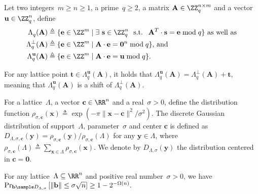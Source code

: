 \begin{definition} \label{de:qary-lattices} 
  Let two integers~$m \geq n \geq 1$, a prime~$q \geq 2$, a matrix $\mathbf{A} \in \ZZ_q^{n \times m}$ and a vector~$\mathbf{u} \in \ZZ_q^n$, define
  \begin{align*}
    \Lambda_q^{}(\mathbf{A})               & \triangleq \{ \mathbf{e} \in \ZZ^m_{} \mid \exists~\mathbf{s} \in \ZZ_q^n ~\text{ s.t. }~\mathbf{A}^T_{} \cdot \mathbf{s} = \mathbf{e} \bmod q \} \text{ as well as}\\
    \Lambda_q^{\perp} (\mathbf{A})      & \triangleq \{\mathbf{e} \in \ZZ^m_{} \mid \mathbf{A} \cdot \mathbf{e} = \mathbf{0}^n \bmod q \} \text{, and}\\
    \Lambda_q^{\mathbf{u}} (\mathbf{A}) & \triangleq  \{\mathbf{e} \in \ZZ^m_{} \mid \mathbf{A} \cdot \mathbf{e} = \mathbf{u} \bmod q \}.
  \end{align*}

  For any lattice point $\mathbf{t} \in \Lambda_q^{\mathbf{u}} (\mathbf{A})$, it holds that $\Lambda_q^{\mathbf{u}}(\mathbf{A})=\Lambda_q^{\perp}(\mathbf{A}) + \mathbf{t}$, meaning that $\Lambda_q^{\mathbf{u}} (\mathbf{A}) $
  is a shift of   $\Lambda_q^{\perp} (\mathbf{A})$.
\end{definition}

\begin{definition} 
  For a lattice~$\Lambda$, a vector $\mathbf{c} \in \RR^n$ and a real~$\sigma>0$, define the distribution function
  $\rho_{\sigma,\mathbf{c}}(\mathbf{x}) \triangleq \exp(-\pi\|\mathbf{x}- \mathbf{c} \|^2/\sigma^2)$.
  The discrete Gaussian distribution of support~$\Lambda$, parameter~$\sigma$ and center $\mathbf{c}$ is defined as
  $D_{\Lambda,\sigma,\mathbf{c}}(\mathbf{y}) = \rho_{\sigma,\mathbf{c}}(\mathbf{y})/\rho_{\sigma,\mathbf{c}}(\Lambda)$ for any $\mathbf{y} \in \Lambda$, where $\rho_{\sigma, \mathbf{c}}(\Lambda) \triangleq \sum_{\mathbf x \in \Lambda} \rho_{\sigma, \mathbf{c}}(\mathbf{x})$.
  We denote by  $D_{\Lambda,\sigma}(\mathbf{y}) $ the distribution centered in $\mathbf{c}=\mathbf{0}$.
\end{definition}

\begin{lemma}
\label{le:small}
For any lattice~$\Lambda \subseteq \RR^{n}_{}$ and positive real number~$\sigma>0$, we have
$\Pr_{\mathbf{b} \sample D_{\Lambda,\sigma}} \left[ \|\mathbf{b}\| \leq \sigma \sqrt{n} \right] \geq 1-2^{-\Omega(n)}.$
\end{lemma}

